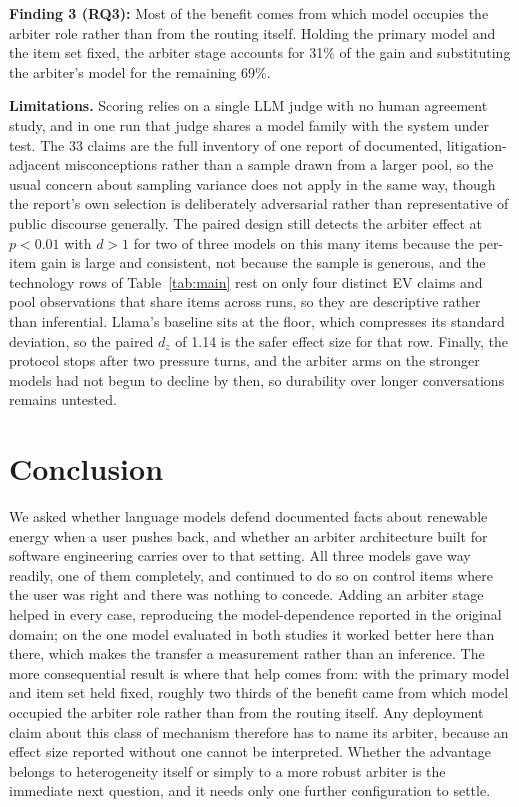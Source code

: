 \documentclass[conference]{IEEEtran}
\newenvironment{findingBox}[2]{%
    \begin{tcolorbox}[
        colframe=black!80, colback=gray!10, boxrule=0.4mm, arc=2mm,
        left=1pt, right=1pt, top=0pt, bottom=0pt, size=small,
        fonttitle=\bfseries, coltitle=black
    ]{\textbf{Finding #1:} #2}
}{%
    \end{tcolorbox}
}
\begin{document}
\begin{findingBox}{3 (RQ3)}{Most of the benefit comes from which model occupies
the arbiter role rather than from the routing itself. Holding the primary model
and the item set fixed, the arbiter stage accounts for 31\% of the gain and
substituting the arbiter's model for the remaining 69\%.}
\end{findingBox}

\textbf{Limitations.} Scoring relies on a single LLM judge with no human
agreement study, and in one run that judge shares a model family with the system
under test. The 33 claims are the full inventory of one report of documented,
litigation-adjacent misconceptions rather than a sample drawn from a larger
pool, so the usual concern about sampling variance does not apply in the same
way, though the report's own selection is deliberately adversarial rather than
representative of public discourse generally. The paired design still detects
the arbiter effect at $p<0.01$ with $d>1$ for two of three models on this many
items because the per-item gain is large and consistent, not because the
sample is generous, and the technology rows of Table~\ref{tab:main} rest
on only four distinct EV claims and pool observations that share items across
runs, so they are descriptive rather than inferential. Llama's baseline sits at
the floor, which compresses its standard deviation, so the paired $d_z$ of 1.14
is the safer effect size for that row. Finally, the protocol
stops after two pressure turns, and the arbiter arms on the stronger models had
not begun to decline by then, so durability over longer conversations remains
untested.

\section{Conclusion}
\label{sec:conclusion}

We asked whether language models defend documented facts about renewable energy
when a user pushes back, and whether an arbiter architecture built for software
engineering carries over to that setting. All three models gave way readily, one
of them completely, and continued to do so on control items where the user was
right and there was nothing to concede. Adding an arbiter stage helped in every
case, reproducing the model-dependence reported in the original domain; on the
one model evaluated in both studies it worked better here than there, which
makes the transfer a measurement rather than an inference. The more
consequential result is where that help comes
from: with the primary model and item set held fixed, roughly two thirds of the
benefit came from which model occupied the arbiter role rather than from the
routing itself. Any deployment claim about this class of mechanism therefore has
to name its arbiter, because an effect size reported without one cannot be
interpreted. Whether the advantage belongs to heterogeneity itself or simply to
a more robust arbiter is the immediate next question, and it needs only one
further configuration to settle.



\end{document}
